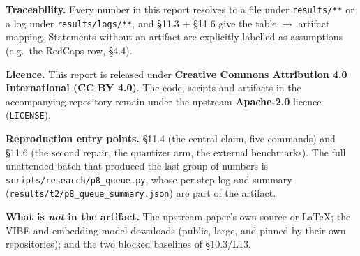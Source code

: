 \documentclass[
  10pt,
]{article}
\begin{document}
\textbf{Traceability.} Every number in this report resolves to a file
under \texttt{results/**} or a log under \texttt{results/logs/**}, and
§11.3 + §11.6 give the table $\rightarrow$ artifact mapping. Statements without an
artifact are explicitly labelled as assumptions (e.g.~the RedCaps row,
§4.4).

\textbf{Licence.} This report is released under \textbf{Creative Commons
Attribution 4.0 International (CC BY 4.0)}. The code, scripts and
artifacts in the accompanying repository remain under the upstream
\textbf{Apache-2.0} licence (\texttt{LICENSE}).

\textbf{Reproduction entry points.} §11.4 (the central claim, five
commands) and §11.6 (the second repair, the quantizer arm, the external
benchmarks). The full unattended batch that produced the last group of
numbers is \texttt{scripts/research/p8\_queue.py}, whose per-step log
and summary (\texttt{results/t2/p8\_queue\_summary.json}) are part of
the artifact.

\textbf{What is \emph{not} in the artifact.} The upstream paper's own
source or LaTeX; the VIBE and embedding-model downloads (public, large,
and pinned by their own repositories); and the two blocked baselines of
§10.3/L13.
\end{document}
